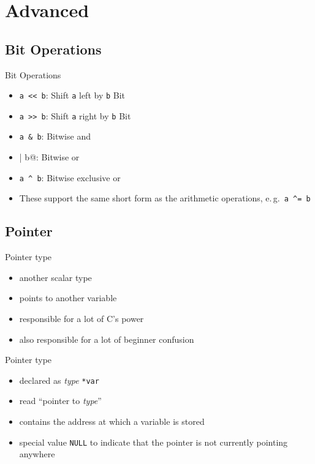 \documentclass[english,compress]{beamer}
\begin{document}
\section{Advanced}
\subsection{Bit Operations}
\begin{frame}{Bit Operations}
	\begin{itemize}
		\item \lstinline|a << b|: Shift \lstinline|a| left by \lstinline|b| Bit
		\item \lstinline|a >> b|: Shift \lstinline|a| right by \lstinline|b| Bit
		\item \lstinline|a & b|: Bitwise and
		\item \lstinline@a | b@: Bitwise or
		\item \lstinline|a ^ b|: Bitwise exclusive or
		\item These support the same short form as the arithmetic operations, e.\,g.\ \lstinline|a ^= b|
	\end{itemize}
\end{frame}

\subsection{Pointer}
\begin{frame}{Pointer type}
	\begin{itemize}
		\item another scalar type
		\item points to another variable
		\item responsible for a lot of C's power
		\item also responsible for a lot of beginner confusion
	\end{itemize}
\end{frame}

\begin{frame}[fragile]{Pointer type}
	\begin{itemize}
		\item declared as {\it\color{blue}type} \lstinline|*var|
		\item read ``pointer to {\it\color{blue}type}''
		\item contains the address at which a variable is stored
		\item special value \lstinline|NULL| to indicate that
			the pointer is not currently pointing anywhere
	\end{itemize}
\end{frame}
\end{document}

